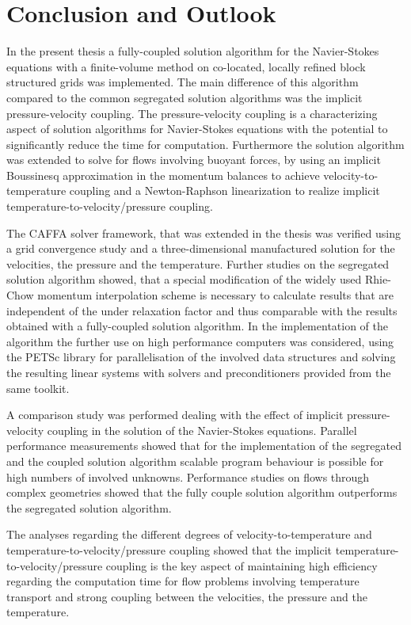 \section{Conclusion and Outlook}

In the present thesis a fully-coupled solution algorithm for the Navier-Stokes equations with a finite-volume method on co-located, locally refined block structured grids was implemented. The main difference of this algorithm compared to the common segregated solution algorithms was the implicit pressure-velocity coupling. The pressure-velocity coupling is a characterizing aspect of solution algorithms for Navier-Stokes equations with the potential to significantly reduce the time for computation. Furthermore the solution algorithm was extended to solve for flows involving buoyant forces, by using an implicit Boussinesq approximation in the momentum balances to achieve velocity-to-temperature coupling and a Newton-Raphson linearization to realize implicit temperature-to-velocity/pressure coupling.

The CAFFA solver framework, that was extended in the thesis was verified using a grid convergence study and a three-dimensional manufactured solution for the velocities, the pressure and the temperature. Further studies on the segregated solution algorithm showed, that a special modification of the widely used Rhie-Chow momentum interpolation scheme is necessary to calculate results that are independent of the under relaxation factor and thus comparable with the results obtained with a fully-coupled solution algorithm. In the implementation of the algorithm the further use on high performance computers was considered, using the PETSc library for parallelisation of the involved data structures and solving the resulting linear systems with solvers and preconditioners provided from the same toolkit.

A comparison study was performed dealing with the effect of implicit pressure-velocity coupling in the solution of the Navier-Stokes equations. Parallel performance measurements showed that for the implementation of the segregated and the coupled solution algorithm scalable program behaviour is possible for high numbers of involved unknowns. Performance studies on flows through complex geometries showed that the fully couple solution algorithm outperforms the segregated solution algorithm. 

The analyses regarding the different degrees of velocity-to-temperature and temperature-to-velocity/pressure coupling showed that the implicit temperature-to-velocity/pressure coupling is the key aspect of maintaining high efficiency regarding the computation time for flow problems involving temperature transport and strong coupling between the velocities, the pressure and the temperature.


